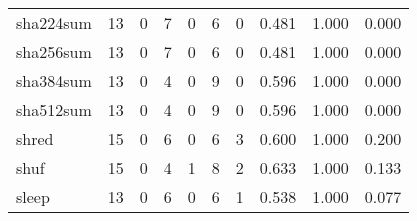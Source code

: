 \begin{longtable}{lp{1.3cm}p{1.3cm}p{1.3cm}p{1.3cm}p{1.3cm}p{1.3cm}p{1.3cm}p{1.3cm}p{1.3cm}}
sha224sum &                     13 &                                             0 &                                            7 &                                           0 &                                            6 &                                          0 &                                0.481 &                                  1.000 &                                0.000 \\
sha256sum &                     13 &                                             0 &                                            7 &                                           0 &                                            6 &                                          0 &                                0.481 &                                  1.000 &                                0.000 \\
sha384sum &                     13 &                                             0 &                                            4 &                                           0 &                                            9 &                                          0 &                                0.596 &                                  1.000 &                                0.000 \\
sha512sum &                     13 &                                             0 &                                            4 &                                           0 &                                            9 &                                          0 &                                0.596 &                                  1.000 &                                0.000 \\
shred     &                     15 &                                             0 &                                            6 &                                           0 &                                            6 &                                          3 &                                0.600 &                                  1.000 &                                0.200 \\
shuf      &                     15 &                                             0 &                                            4 &                                           1 &                                            8 &                                          2 &                                0.633 &                                  1.000 &                                0.133 \\
sleep     &                     13 &                                             0 &                                            6 &                                           0 &                                            6 &                                          1 &                                0.538 &                                  1.000 &                                0.077 \\

\end{longtable}
